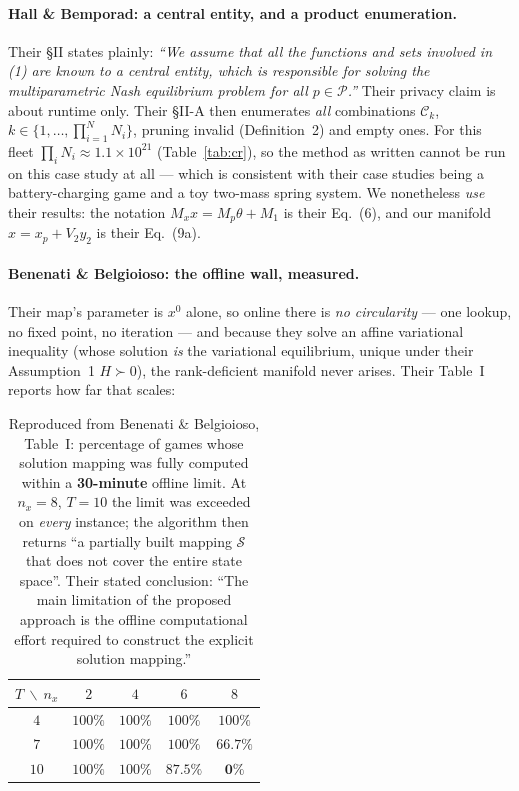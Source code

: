 \documentclass[11pt, letterpaper]{article}
\begin{document}
\paragraph{Hall \& Bemporad: a central entity, and a product enumeration.}
Their \S II states plainly: \emph{``We assume that all the functions and sets involved in (1) are known
to a central entity, which is responsible for solving the multiparametric Nash equilibrium problem for
all $p\in\mathcal P$.''} Their privacy claim is about runtime only. Their \S II-A then enumerates
\emph{all} combinations $\mathcal C_k$, $k\in\{1,\dots,\prod_{i=1}^N N_i\}$, pruning invalid
(Definition~2) and empty ones. For this fleet $\prod_iN_i\approx1.1\times10^{21}$
(Table~\ref{tab:cr}), so the method as written cannot be run on this case study at all --- which is
consistent with their case studies being a battery-charging game and a toy two-mass spring system.
We nonetheless \emph{use} their results: the notation $M_xx=M_p\theta+M_1$ is their Eq.~(6), and our
manifold $x=x_p+V_2y_2$ is their Eq.~(9a).

\paragraph{Benenati \& Belgioioso: the offline wall, measured.}
Their map's parameter is $x^0$ alone, so online there is \emph{no circularity} --- one lookup, no
fixed point, no iteration --- and because they solve an affine variational inequality (whose solution
\emph{is} the variational equilibrium, unique under their Assumption~1 $H\succ0$), the rank-deficient
manifold never arises. Their Table~I reports how far that scales:

\begin{table}[H]\centering\small
\begin{tabular}{ccccc}
\toprule
$T\ \backslash\ n_x$ & $2$ & $4$ & $6$ & $8$\\
\midrule
$4$  & $100\%$ & $100\%$ & $100\%$   & $100\%$\\
$7$  & $100\%$ & $100\%$ & $100\%$   & $66.7\%$\\
$10$ & $100\%$ & $100\%$ & $87.5\%$  & $\mathbf{0\%}$\\
\bottomrule
\end{tabular}
\caption{Reproduced from Benenati \& Belgioioso, Table~I: percentage of games whose solution mapping
was fully computed within a \textbf{30-minute} offline limit. At $n_x{=}8$, $T{=}10$ the limit was
exceeded on \emph{every} instance; the algorithm then returns ``a partially built mapping
$\mathcal S$ that does not cover the entire state space''. Their stated conclusion: ``The main
limitation of the proposed approach is the offline computational effort required to construct the
explicit solution mapping.''}
\label{tab:benenati}
\end{table}
\end{document}
